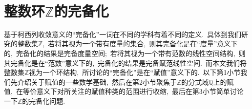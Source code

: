 \documentclass[UTF8, twoside]{ctexart}
\theoremstyle{nonumberplain}
\theoremstyle{nonumberplain}
\theoremstyle{plain}
\begin{document}
	
	
	
	
	\newpage
	\ 
	\newpage
	\section{整数环${\mathbb{Z}}$的完备化}
	基于柯西列收敛意义的“完备化”一词在不同的学科有着不同的定义.\ 
	具体到我们研究的整数集$\mathbb{Z}$,\ 
	若将其视为一个带有度量\cite[第二章\S~1]{chengqixiang}的集合,\ 则其完备化是在“度量”意义下的,\ 
	完备化的结果是完备度量空间\cite[第七章\S~4]{chengqixiang};\ 
	若将其视为一个带有范数\cite[第六章\S~3]{xiadaoxing}的线性空间结构,\ 则其完备化是在“范数”意义下的,\ 
	完备化的结果是完备赋范线性空间\cite[第六章\S~5]{xiadaoxing}.\ 
	而本文我们将整数集$\mathbb{Z}$视为一个环结构,\ 所讨论的“完备化”是在“赋值”意义下的.\ 
	以下第1小节我们先介绍关于赋值的一些数学基础,\ 
	然后在第2小节聚焦于$\mathbb{Z}$的分式域$\mathbb{Q}$上的赋值,\ 在等价意义下对所关注的赋值种类的范围进行收缩,\ 
	最后在第3小节简单讨论一下$\mathbb{Z}$的完备化问题.\ 
	\\ \phantom{哈哈}
	
\end{document}
